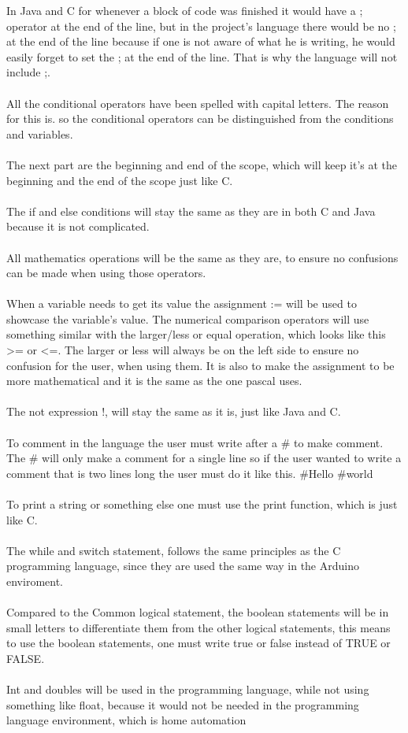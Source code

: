  
In Java and C for whenever a block of code was finished it would have a ; operator at the end of the line, but in the project's language there would be no ; at the end of the line because if one is not aware of what he is writing, he would easily forget to set the ; at the end of the line. That is why the language will not include ;. \\
 \\
All the conditional operators have been spelled with capital letters. The reason for this is. so the conditional operators can be distinguished from the conditions and variables. \\
 \\
The next part are the beginning and end of the scope, which will keep it's {} at the beginning and the end of the scope just like C.  \\
 \\
The if and else conditions will stay the same as they are in both C and Java because it is not complicated. \\
 \\
All mathematics operations will be the same as they are, to ensure no confusions can be made when using those operators. \\
 \\
When a variable needs to get its value the assignment := will be used to showcase the variable's value. The numerical comparison operators will use something similar with the  larger/less or equal operation, which looks like this >= or <=. The larger or less will always be on the left side to ensure no confusion for the user, when using them. It is also to make the assignment to be more mathematical and it is the same as the one pascal uses.  \\
 \\
The not expression !, will stay the same as it is, just like Java and C. \\
 \\
To comment in the language the user must write after a \# to make comment. The \# will only make a comment for a single line so if the user wanted to write a comment that is two lines long the user must do it like this.
\#Hello
\#world \\
 \\
To print a string or something else one must use the print function, which is just like C.\\
 \\
The while and switch statement, follows the same principles as the C programming language, since they are used the same way in the Arduino enviroment.\\
 \\
Compared to the Common logical statement, the boolean statements will be in small letters to differentiate them from the other logical statements, this means to use the boolean statements, one must write true or false instead of TRUE or FALSE.\\
 \\
 Int and doubles will be used in the programming language, while not using something like float, because it would not be needed in the programming language environment, which is home automation
 
